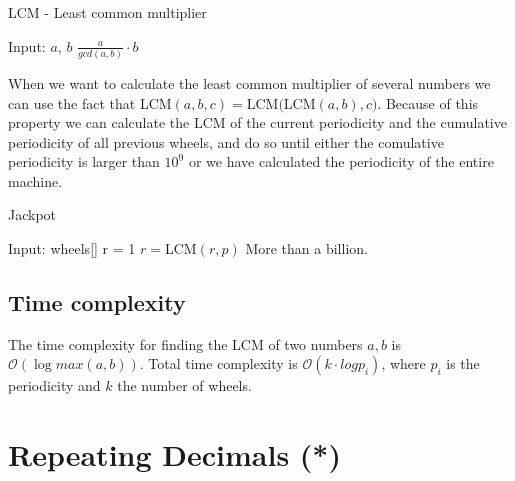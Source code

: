 \documentclass[11pt,a4paper,twoside]{article}
\begin{document}
\begin{algorithm}
    \caption{LCM - Least common multiplier}
    \label{lst:LCM}
    \begin{algorithmic}
        \REQUIRE Input: $a$, $b$
        \RETURN $ \frac{a}{gcd(a, b)} \cdot b$
    \end{algorithmic}
\end{algorithm}

When we want to calculate the least common multiplier of several numbers we can
use the fact that LCM$(a, b, c) = $LCM$($LCM$(a, b), c)$. Because of this
property we can calculate the LCM of the current periodicity and the cumulative
periodicity of all previous wheels, and do so until either the comulative
periodicity is larger than $10^9$ or we have calculated the periodicity of the
entire machine.

\begin{algorithm}
    \caption{Jackpot}
    \label{lst:jackpot}
    \begin{algorithmic}
        \REQUIRE Input: wheels[] 
        \STATE r = 1
            \STATE $r = $LCM$(r, p)$
                \PRINT More than a billion.
            \ENDIF
        \ENDFOR
    \end{algorithmic}
\end{algorithm}

\subsection{Time complexity}
The time complexity for finding the LCM of two numbers $a,b$ is
$\mathcal{O}(\log{max(a,b)})$. Total time complexity is $\mathcal{O}(k \cdot
log{p_i})$, where $p_i$ is the periodicity and $k$ the number of wheels.

\section{Repeating Decimals (*)}
\end{document}

